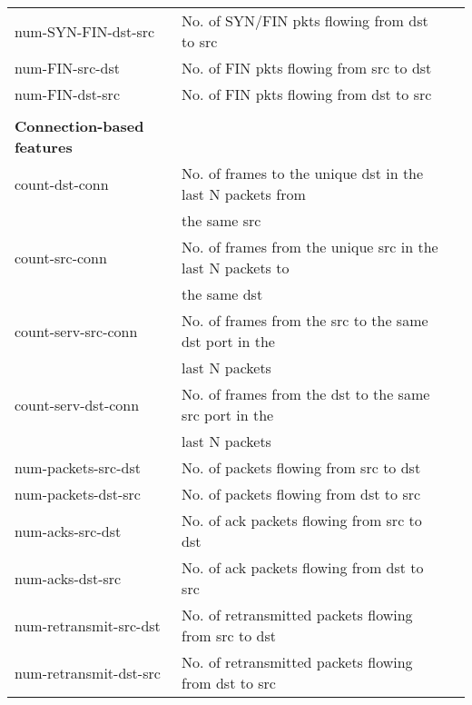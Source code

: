 {\begin{tabular}{llr}
		num-SYN-FIN-dst-src & No. of SYN/FIN pkts flowing from dst to src\\
		num-FIN-src-dst & No. of FIN pkts flowing from src to dst\\
		num-FIN-dst-src & No. of FIN pkts flowing from dst to src\\
		&  \\
		\textbf{Connection-based features} & \\
		count-dst-conn & No. of frames to the unique dst in the last N packets from\\
		& the same src\\
		count-src-conn & No. of frames from the unique src in the last N packets to \\
		&the same dst\\
		count-serv-src-conn & No. of frames from the src to the same dst port in the\\
		& last N packets\\
		count-serv-dst-conn & No. of frames from the dst to the same src port in the\\
		& last N packets\\
		num-packets-src-dst & No. of packets flowing from src to dst\\
		num-packets-dst-src & No. of packets flowing from dst to src\\
		num-acks-src-dst & No. of ack packets flowing from src to dst\\
		num-acks-dst-src & No. of ack packets flowing from dst to src\\
		num-retransmit-src-dst & No. of retransmitted packets flowing from src to dst\\
		num-retransmit-dst-src & No. of retransmitted packets flowing from dst to src\\
		\hline
	\end{tabular}
}

\bigskip
\bigskip
\bigskip
\bigskip
\bigskip
\bigskip
\bigskip
\bigskip


